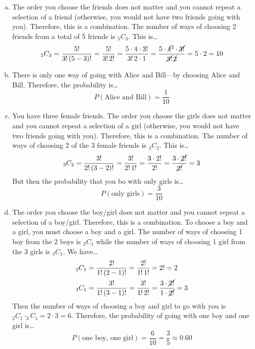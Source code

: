 \documentclass[11pt,letterpaper]{article}
\begin{document}
\sol 
\begin{enumerate}[(a)]
\item The order you choose the friends does not matter and you cannot repeat a selection of a friend (otherwise, you would not have two friends going with you). Therefore, this is a combination. The number of ways of choosing 2 friends from a total of 5 friends is $_5C_3$. This is\dots
	\[
	_5C_3= \dfrac{5!}{3!\, (5 - 3)!}= \dfrac{5!}{3!\, 2!}= \dfrac{5 \cdot 4 \cdot 3!}{3!\, 2 \cdot 1}= \dfrac{5 \cdot \cancel{4}^2 \cdot \cancel{3!}}{\cancel{3!}\, \cancel{2}}= 5 \cdot 2= 10 
	\] \pspace

\item There is only one way of going with Alice and Bill---by choosing Alice and Bill. Therefore, the probability is\dots
	\[
	P(\text{Alice and Bill})= \dfrac{1}{10}
	\] \pspace

\item You have three female friends. The order you choose the girls does not matter and you cannot repeat a selection of a girl (otherwise, you would not have two friends going with you). Therefore, this is a combination. The number of ways of choosing 2 of the 3 female friends is $_3C_2$. This is\dots
	\[
	_3C_2= \dfrac{3!}{2!\, (3 - 2)!}= \dfrac{3!}{2!\, 1!}= \dfrac{3 \cdot 2!}{2!}= \dfrac{3 \cdot \cancel{2!}}{\cancel{2!}}= 3
	\]
But then the probability that you bo with only girls is\dots
	\[
	P(\text{only girls})= \dfrac{3}{10}
	\] 

\item The order you choose the boy/girl does not matter and you cannot repeat a selection of a boy/girl. Therefore, this is a combination. To choose a boy and a girl, you must choose a boy and a girl. The number of ways of choosing 1 boy from the 2 boys is $_2C_1$ while the number of ways of choosing 1 girl from the 3 girls is $_3C_1$. We have\dots
	\[
	\begin{aligned}
	_2C_1&= \dfrac{2!}{1!\, (2 - 1)!}= \dfrac{2!}{1! \, 1!}= 2!= 2 \\
	_3C_1&= \dfrac{3!}{1!\, (3 - 1)!}= \dfrac{3!}{1!\, 2!}= \dfrac{3 \cdot \cancel{2!}}{1 \cdot \cancel{2!}}= 3
	\end{aligned}
	\]
Then the number of ways of choosing a boy and girl to go with you is $_2C_1 \cdot _3C_1= 2 \cdot 3= 6$. Therefore, the probability of going with one boy and one girl is\dots
	\[
	P(\text{one boy, one girl})= \dfrac{6}{10}= \dfrac{3}{5} \approx 0.60
	\]
\end{enumerate}
\end{document}
